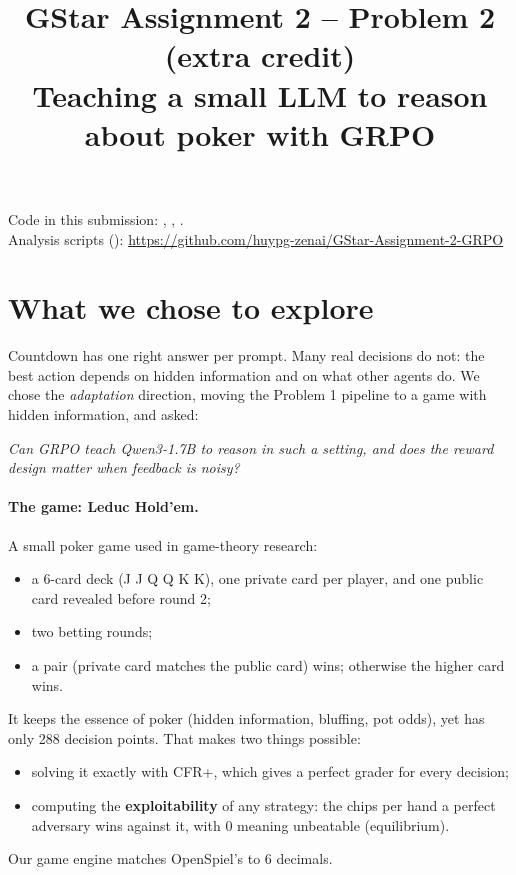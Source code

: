 \documentclass[10.5pt]{article}
\title{\textbf{GStar Assignment 2 -- Problem 2 (extra credit)}\\[2pt]\large Teaching a small LLM to reason about poker with GRPO}
\begin{document}
\maketitle
\vspace{-10pt}
\begin{center}\small
Code in this submission: , , .\\
Analysis scripts (): \url{https://github.com/huypg-zenai/GStar-Assignment-2-GRPO}
\end{center}

\section{What we chose to explore}
Countdown has one right answer per prompt. Many real decisions do not: the best action depends on hidden information and
on what other agents do. We chose the \emph{adaptation} direction, moving the Problem 1 pipeline to a game with hidden
information, and asked:

\begin{center}
\emph{Can GRPO teach Qwen3-1.7B to reason in such a setting, and does the reward design matter when feedback is noisy?}
\end{center}

\paragraph{The game: Leduc Hold'em.} A small poker game used in game-theory research:
\begin{itemize}
\item a 6-card deck (J J Q Q K K), one private card per player, and one public card revealed before round 2;
\item two betting rounds;
\item a pair (private card matches the public card) wins; otherwise the higher card wins.
\end{itemize}
It keeps the essence of poker (hidden information, bluffing, pot odds), yet has only 288 decision points. That makes two
things possible:
\begin{itemize}
\item solving it exactly with CFR+, which gives a perfect grader for every decision;
\item computing the \textbf{exploitability} of any strategy: the chips per hand a perfect adversary wins against it, with
  0 meaning unbeatable (equilibrium).
\end{itemize}
Our game engine matches OpenSpiel's  to 6 decimals.
\end{document}
